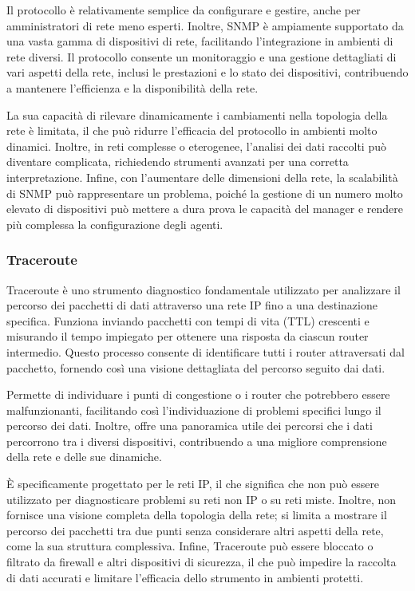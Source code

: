 \documentclass[target=bach,aauheader=,style=]{thud}
\begin{document}
Il protocollo è relativamente semplice da configurare e gestire, anche per amministratori di rete meno esperti. Inoltre, SNMP è ampiamente supportato da una vasta gamma di dispositivi di rete, facilitando l'integrazione in ambienti di rete diversi. Il protocollo consente un monitoraggio e una gestione dettagliati di vari aspetti della rete, inclusi le prestazioni e lo stato dei dispositivi, contribuendo a mantenere l'efficienza e la disponibilità della rete.

La sua capacità di rilevare dinamicamente i cambiamenti nella topologia della rete è limitata, il che può ridurre l'efficacia del protocollo in ambienti molto dinamici. Inoltre, in reti complesse o eterogenee, l'analisi dei dati raccolti può diventare complicata, richiedendo strumenti avanzati per una corretta interpretazione. Infine, con l'aumentare delle dimensioni della rete, la scalabilità di SNMP può rappresentare un problema, poiché la gestione di un numero molto elevato di dispositivi può mettere a dura prova le capacità del manager e rendere più complessa la configurazione degli agenti.

\subsubsection{Traceroute}
Traceroute \cite{netbrain_traceroute} è uno strumento diagnostico fondamentale utilizzato per analizzare il percorso dei pacchetti di dati attraverso una rete IP fino a una destinazione specifica. Funziona inviando pacchetti con tempi di vita (TTL) crescenti e misurando il tempo impiegato per ottenere una risposta da ciascun router intermedio. Questo processo consente di identificare tutti i router attraversati dal pacchetto, fornendo così una visione dettagliata del percorso seguito dai dati.

Permette di individuare i punti di congestione o i router che potrebbero essere malfunzionanti, facilitando così l’individuazione di problemi specifici lungo il percorso dei dati. Inoltre, offre una panoramica utile dei percorsi che i dati percorrono tra i diversi dispositivi, contribuendo a una migliore comprensione della rete e delle sue dinamiche.

È specificamente progettato per le reti IP, il che significa che non può essere utilizzato per diagnosticare problemi su reti non IP o su reti miste. Inoltre, non fornisce una visione completa della topologia della rete; si limita a mostrare il percorso dei pacchetti tra due punti senza considerare altri aspetti della rete, come la sua struttura complessiva. Infine, Traceroute può essere bloccato o filtrato da firewall e altri dispositivi di sicurezza, il che può impedire la raccolta di dati accurati e limitare l’efficacia dello strumento in ambienti protetti.
\end{document}
